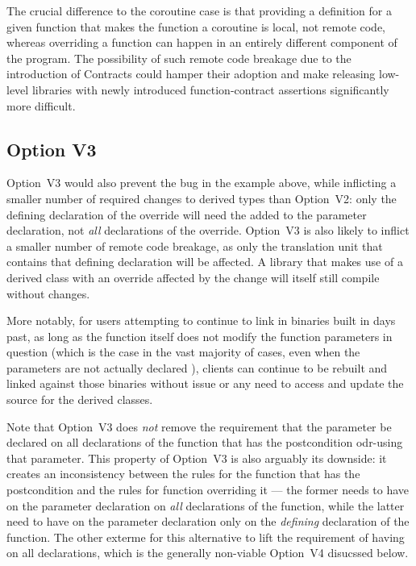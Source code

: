 The crucial difference to the coroutine case is that providing a definition for a given function that makes the function a coroutine is local, not remote code, whereas overriding a function can happen in an entirely different component of the program. The possibility of such remote code breakage due to the introduction of Contracts could hamper their adoption and make releasing low-level libraries with newly introduced function-contract assertions significantly more difficult.

\subsection*{Option V3}

Option~V3 would also prevent the bug in the example above, while inflicting a smaller number of required changes to derived types than Option~V2: only the defining declaration of the override will need the  added to the parameter declaration, not \emph{all} declarations of the override.
Option~V3 is also likely to inflict a smaller number of remote code breakage, as only the translation unit that contains that defining declaration will be affected. A library that makes use of a derived class with an override affected by the change will itself still compile without changes.

More notably, for users attempting to continue to link in binaries built in days past, as long as the function itself does not modify the function parameters in question (which is the case in the vast majority of cases, even when the parameters are not actually declared ), clients can continue to be rebuilt and linked against those binaries without issue or any need to access and update the source for the derived classes.

Note that Option~V3 does \emph{not} remove the requirement that the parameter be declared  on all declarations of the function that has the postcondition odr-using that parameter. This property of Option~V3 is also arguably its downside: it creates an inconsistency between the rules for the function that has the postcondition and the rules for function overriding it --- the former needs to have  on the parameter declaration on \emph{all} declarations of the function, while the latter need to have  on the parameter declaration only on the \emph{defining} declaration of the function. The other exterme for this alternative to lift the requirement of having  on all declarations, which is the generally non-viable Option~V4 disucssed below.


